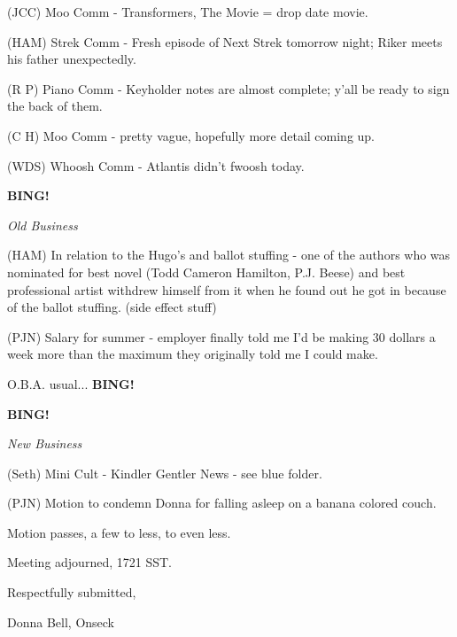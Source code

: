 \documentclass[12pt]{article}
\newcommand{\bing}{{\bf BING!} }
\newcommand{\goto}[1]{\bing \vskip 12pt \centerline{{\em{#1}}}}
\begin{document}
(JCC) Moo Comm - Transformers, The Movie = drop date movie.

(HAM) Strek Comm - Fresh episode of Next Strek tomorrow night; Riker meets his father unexpectedly.

(R P) Piano Comm - Keyholder notes are almost complete; y'all be ready to sign the back of them.

(C H) Moo Comm - pretty vague, hopefully more detail coming up.

(WDS) Whoosh Comm - Atlantis didn't fwoosh today.

\goto{Old Business}

(HAM) In relation to the Hugo's and ballot stuffing - one of the authors who was nominated for best novel (Todd Cameron Hamilton, P.J. Beese) and best professional artist withdrew himself from it when he found out he got in because of the ballot stuffing.  (side effect stuff)

(PJN) Salary for summer - employer finally told me I'd be making 30 dollars a week more than the maximum they originally told me I could make.

O.B.A. usual... \bing

\goto{New Business}

(Seth) Mini Cult - Kindler Gentler News - see blue folder.

(PJN) Motion to condemn Donna for falling asleep on a banana colored couch.

Motion passes, a few to less, to even less.

\vspace{12pt}

\noindent
Meeting adjourned, 1721 SST.

\vspace{18pt}

\centerline{Respectfully submitted,}
\centerline{Donna Bell, Onseck}
\end{document}
